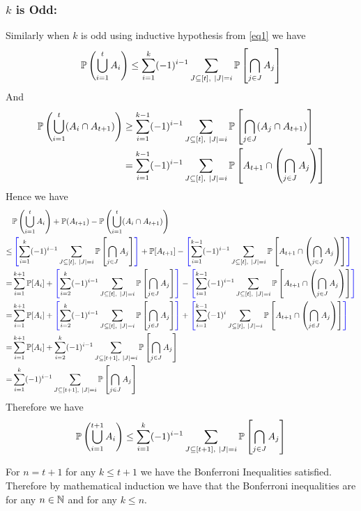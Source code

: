 \documentclass[a4paper, 11pt]{article}
\begin{document}
{\begin{enumerate}[label=(\alph*)]
\subsubsection*{$k$ is Odd:}
Similarly when $k$ is odd using inductive hypothesis from \eqref{eq1} we have  $$\bbP\left(\bigcup_{i=1}^t A_i\right)
\leq \sum\limits_{i=1}^k(-1)^{i-1}\sum\limits_{J\subseteq [t],\ |J|=i}\bbP\lt[\bigcap\limits_{j\in J}A_j\rt] $$And \begin{align*}
	\bbP\left(\bigcup_{i=1}^t (A_i\cap A_{t+1})\right)& \geq  \sum\limits_{i=1}^{k-1}(-1)^{i-1}\sum\limits_{J\subseteq [t],\ |J|=i}\bbP\lt[ \bigcap_{j\in J}(A_j\cap A_{t+1}) \rt]\\
	& = \sum_{i=1}^{k-1}(-1)^{i-1}\sum_{J\subseteq [t],\ |J|=i}\bbP\lt[ A_{t+1}\cap\lt( \bigcap_{j\in J}A_j \rt)\rt]
\end{align*}Hence we have \begin{align*}
&\bbP\left(\bigcup_{i=1}^t A_i\right)+\bbP(A_{t+1})-\bbP\left(\bigcup_{i=1}^t (A_i\cap A_{t+1})\right)\\
\leq &  \mathcolor{blue}{\left[}\sum\limits_{i=1}^k(-1)^{i-1}\sum\limits_{J\subseteq [t],\ |J|=i}\bbP\lt[\bigcap\limits_{j\in J}A_j\rt]\mathcolor{blue}{\right]}+\bbP[A_{t+1}]-\mathcolor{blue}{\left[}\sum_{i=1}^{k-1}(-1)^{i-1}\sum_{J\subseteq [t],\ |J|=i}\bbP\lt[ A_{t+1}\cap\lt( \bigcap_{j\in J}A_j \rt)\rt]\mathcolor{blue}{\right]}\\
= & \sum_{i=1}^{k+1}\bbP[A_i]+ \mathcolor{blue}{\left[}\sum\limits_{i=2}^k(-1)^{i-1}\sum\limits_{J\subseteq [t],\ |J|=i}\bbP\lt[\bigcap\limits_{j\in J}A_j\rt]\mathcolor{blue}{\right]}-\mathcolor{blue}{\left[}\sum_{i=1}^{k-1}(-1)^{i-1}\sum_{J\subseteq [t],\ |J|=i}\bbP\lt[ A_{t+1}\cap\lt( \bigcap_{j\in J}A_j \rt)\rt]\mathcolor{blue}{\right]}\\
= & \sum_{i=1}^{k+1}\bbP[A_i]+ \mathcolor{blue}{\left[}\sum\limits_{i=2}^k(-1)^{i-1}\sum\limits_{J\subseteq [t],\ |J|=i}\bbP\lt[\bigcap\limits_{j\in J}A_j\rt]\mathcolor{blue}{\right]}+\mathcolor{blue}{\left[}\sum_{i=1}^{k-1}(-1)^{i}\sum_{J\subseteq [t],\ |J|=i}\bbP\lt[ A_{t+1}\cap\lt( \bigcap_{j\in J}A_j \rt)\rt]\mathcolor{blue}{\right]}\\
= &  \sum_{i=1}^{k+1}\bbP[A_i]+ \sum\limits_{i=2}^k(-1)^{i-1}\sum\limits_{J\subseteq [t+1],\ |J|=i}\bbP\lt[\bigcap\limits_{j\in J}A_j\rt]\\
= & \sum\limits_{i=1}^k(-1)^{i-1}\sum\limits_{J\subseteq [t+1],\ |J|=i}\bbP\lt[\bigcap\limits_{j\in J}A_j\rt]
\end{align*}Therefore we have $$\mathbb{P}\left(\bigcup_{i=1}^{t+1}A_i\right)\leq  \sum\limits_{i=1}^k(-1)^{i-1}\sum\limits_{J\subseteq [t+1],\ |J|=i}\mathbb{P}\left[\bigcap\limits_{j\in J}A_j\right]$$

For $n=t+1$ for any $k\leq t+1$ we have the Bonferroni Inequalities satisfied. Therefore by mathematical induction we have that the Bonferroni inequalities are for any $n\in \mathbb{N}$ and for any $k\leq n$.
		\end{enumerate}
}
\end{document}
